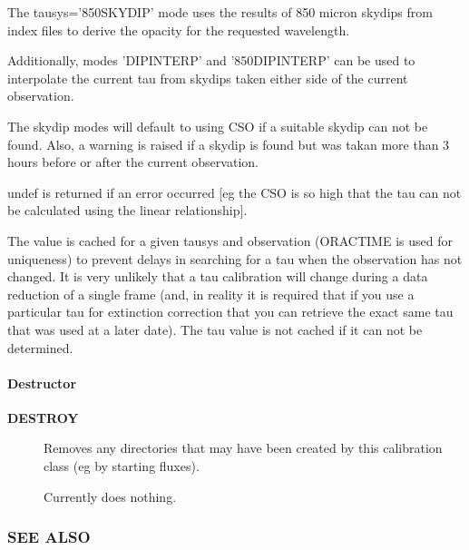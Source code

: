 \begin{description}
The tausys='850SKYDIP' mode uses the results of 850 micron skydips
from index files to derive the opacity for the requested wavelength.



Additionally, modes 'DIPINTERP' and '850DIPINTERP' can be used to
interpolate the current tau from skydips taken either side of the
current observation.



The skydip modes will default to using CSO if a suitable
skydip can not be found. Also, a warning is raised if a skydip
is found but was takan more than 3 hours before or after the
current observation.



undef is returned if an error occurred [eg the CSO is so high that the
tau can not be calculated using the linear relationship].



The value is cached for a given tausys and observation (ORACTIME is
used for uniqueness) to prevent delays in searching for a tau when the
observation has not changed. It is very unlikely that a tau calibration
will change during a data reduction of a single frame (and, in reality
it is required that if you use a particular tau for extinction correction
that you can retrieve the exact same tau that was used at a later date).
The tau value is not cached if it can not be determined.

\end{description}
\paragraph*{Destructor\label{ORAC::Calib::SCUBA_Destructor}}
\begin{description}

\item[{\textbf{DESTROY}}] \mbox{}

Removes any directories that may have been created by this
calibration class (eg by starting fluxes).



Currently does nothing.

\end{description}
\subsubsection*{SEE ALSO\label{ORAC::Calib::SCUBA_SEE_ALSO}}


